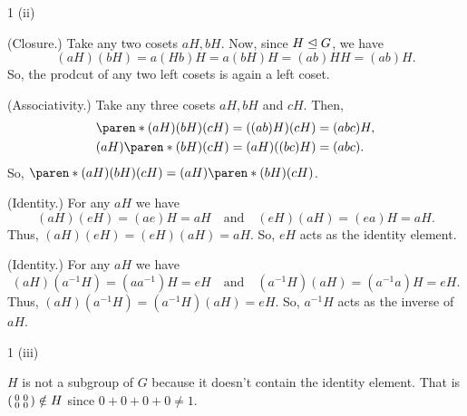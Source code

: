 \documentclass[11pt]{penrose}
\begin{document}
\begin{problem}{1 (ii)}

    (Closure.) Take any two cosets $aH, bH$. Now, since $H \mathrel{\trianglelefteq} G$, we have
    \begin{equation*}
        (aH)(bH) = a(Hb)H = a(bH)H = (ab)HH = (ab)H.
    \end{equation*}
    So, the prodcut of any two left cosets is again a left coset.

    (Associativity.) Take any three cosets $aH, bH$ and $cH$. Then,
    \begin{align*}
        \paren*{(aH)(bH)}(cH) &= ((ab)H)(cH) = (abc)H,\\
        (aH)\paren*{(bH)(cH)} &= (aH)((bc)H) = (abc).
    \end{align*}
    So, $\paren*{(aH)(bH)}(cH) = (aH)\paren*{(bH)(cH)}$.

    (Identity.) For any $aH$ we have
    \begin{equation*}
        (aH)(eH) = (ae)H = aH
        \quad\text{and}\quad
        (eH)(aH) = (ea)H = aH.
    \end{equation*}
    Thus, $(aH)(eH) = (eH)(aH) = aH$. So, $eH$ acts as the identity element.

    (Identity.) For any $aH$ we have
    \begin{equation*}
        (aH)(a^{-1}H) = (aa^{-1})H = eH
        \quad\text{and}\quad
        (a^{-1}H)(aH) = (a^{-1}a)H = eH.
    \end{equation*}
    Thus, $(aH)(a^{-1}H) = (a^{-1}H)(aH) = eH$. So, $a^{-1}H$ acts as the inverse of $aH$.
\end{problem}

\clearpage
\begin{problem}{1 (iii)}

    $H$ is not a subgroup of $G$ because it doesn't contain the identity element. That is $\begin{psmallmatrix*} 0 & 0 \\ 0 & 0 \end{psmallmatrix*} \notin H$ since $0 + 0 + 0 + 0  \neq 1$.
\end{problem}
\end{document}
